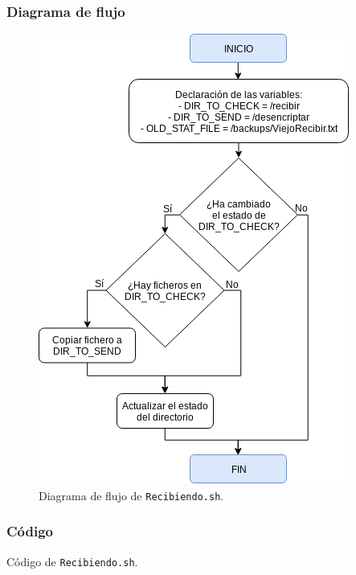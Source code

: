 \subsubsection{Diagrama de flujo}
\begin{figure}[h]
	\centering
	\includegraphics[scale=0.8]{Anexos/Anexo3/Diagramas/Recibiendo.png}
	\caption{Diagrama de flujo de \texttt{Recibiendo.sh}.}
	\label{Diagrama de flujo de Recibiendo.sh}
\end{figure}

\subsubsection{Código}

\begin{center}
	Código de \texttt{Recibiendo.sh}.
\end{center}

